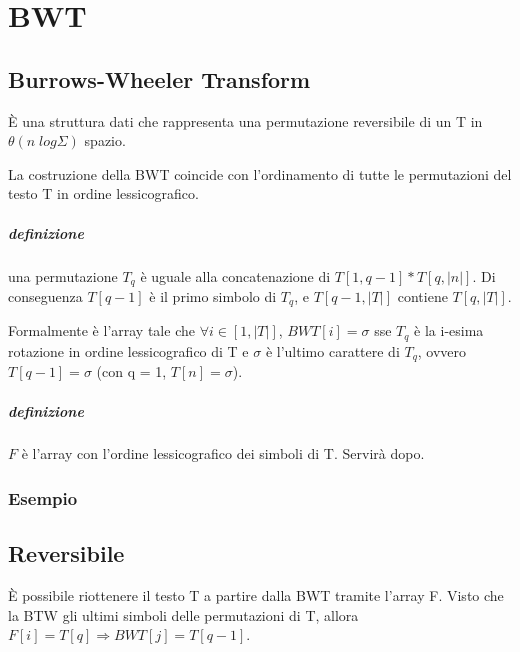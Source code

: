 \chapter{BWT}

\section{Burrows-Wheeler Transform}

\`E una struttura dati che rappresenta una permutazione reversibile di un T in $\theta(n\;log\Sigma)$ spazio.

La costruzione della BWT coincide con l'ordinamento di tutte le permutazioni del testo T in ordine lessicografico.

\paragraph{definizione} una permutazione $T_q$ \`e uguale alla concatenazione di $T[1,q-1] \ast T[q,|n|]$.
Di conseguenza $T[q-1]$ \`e il primo simbolo di $T_q$, e $T[q-1 ,|T|]$ contiene $T[q, |T|]$.

Formalmente \`e l'array tale che $\forall i \in [1,|T|]$, $BWT[i] = \sigma$ sse $T_q$ \`e la i-esima rotazione in ordine lessicografico di T e $\sigma$ \`e l'ultimo carattere di $T_q$, ovvero $T[q-1] = \sigma$ (con q = 1, $T[n] = \sigma$).

\paragraph{definizione} $F$ \`e l'array con l'ordine lessicografico dei simboli di T. Servir\`a dopo.

\subsection{Esempio}


\section{Reversibile}

\`E possibile riottenere il testo T a partire dalla BWT tramite l'array F. Visto che la BTW gli ultimi simboli delle permutazioni di T, allora $F[i] = T[q] \Rightarrow BWT[j] = T[q-1]$.

